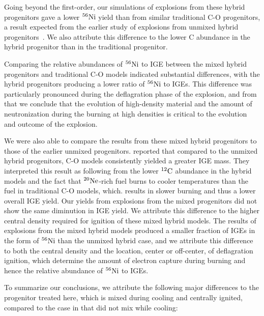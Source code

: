 \documentclass[iop,apj]{emulateapj}
\newcommand{\C}[1]{\ensuremath{{}^{#1}{\rm C}}}
\newcommand{\Ne}[1]{\ensuremath{{}^{#1}{\rm Ne}}}
\newcommand{\Ni}[1]{\ensuremath{{}^{#1}{\rm Ni}}}
\begin{document}
Going beyond the first-order, our simulations of explosions from
these hybrid progenitors gave a lower \Ni{56} yield than from
similar traditional C-O progenitors, a result expected from
the earlier study of explosions from unmixed hybrid 
progenitors~\citep{willcoxetal2016}. We also attribute this 
difference to the lower C abundance in the hybrid progenitor than
in the traditional progenitor. 

Comparing the relative abundances of \Ni{56} to IGE between the
mixed hybrid progenitors and traditional C-O models indicated
substantial differences, with the hybrid progenitors producing
a lower ratio of \Ni{56} to IGEs. This difference was particularly
pronounced during the deflagration phase of the explosion, and 
from that we conclude that the evolution of high-density material
and the amount of neutronization during the burning at high densities
is critical to the evolution and outcome of the explosion.

We were also able to compare the results from these mixed
hybrid progenitors to those of the earlier unmixed progenitors.
\citet{willcoxetal2016} reported that compared to the unmixed
hybrid progenitors, C-O models consistently yielded a greater IGE mass. 
They interpreted this result as following from 
the lower \C{12} abundance in the hybrid models and the fact that \Ne{20}-rich fuel burns to cooler 
temperatures than the fuel in traditional C-O models, which. results in slower burning and thus a lower
overall IGE yield. Our yields from explosions from the mixed progenitors did not
show the same diminution in IGE yield. We attribute this difference to the higher
central density required for ignition of these mixed hybrid models.
The results of explosions from the mixed hybrid models 
produced a smaller fraction of IGEs in the form of \Ni{56} than the unmixed hybrid case, 
and we attribute this difference 
to both the central density and the location, center or off-center, of deflagration ignition,
which determine the amount of electron capture during burning and hence the relative abundance
of \Ni{56} to IGEs.

To summarize our conclusions, we attribute the following major differences to the progenitor treated here, 
which is mixed during cooling and centrally ignited, compared to the case in \citet{willcoxetal2016} 
that did not mix while cooling:
\end{document}
